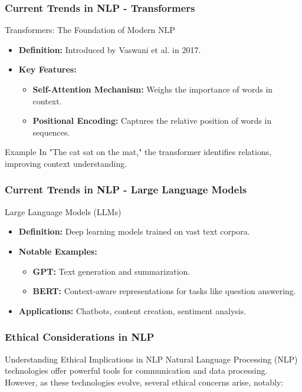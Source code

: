 \documentclass{beamer}
\begin{document}
\begin{frame}[fragile]
    \frametitle{Current Trends in NLP - Transformers}
    \begin{block}{Transformers: The Foundation of Modern NLP}
        \begin{itemize}
            \item \textbf{Definition:} Introduced by Vaswani et al. in 2017.
            \item \textbf{Key Features:}
            \begin{itemize}
                \item \textbf{Self-Attention Mechanism:} Weighs the importance of words in context.
                \item \textbf{Positional Encoding:} Captures the relative position of words in sequences.
            \end{itemize}
        \end{itemize}
    \end{block}
    \begin{exampleblock}{Example}
        In "The cat sat on the mat," the transformer identifies relations, improving context understanding.
    \end{exampleblock}
\end{frame}

\begin{frame}[fragile]
    \frametitle{Current Trends in NLP - Large Language Models}
    \begin{block}{Large Language Models (LLMs)}
        \begin{itemize}
            \item \textbf{Definition:} Deep learning models trained on vast text corpora.
            \item \textbf{Notable Examples:}
            \begin{itemize}
                \item \textbf{GPT:} Text generation and summarization.
                \item \textbf{BERT:} Context-aware representations for tasks like question answering.
            \end{itemize}
            \item \textbf{Applications:} Chatbots, content creation, sentiment analysis.
        \end{itemize}
    \end{block}
\end{frame}

\begin{frame}[fragile]
    \frametitle{Ethical Considerations in NLP}
    \begin{block}{Understanding Ethical Implications in NLP}
        Natural Language Processing (NLP) technologies offer powerful tools for communication and data processing. However, as these technologies evolve, several ethical concerns arise, notably:
    \end{block}
\end{frame}
\end{document}
